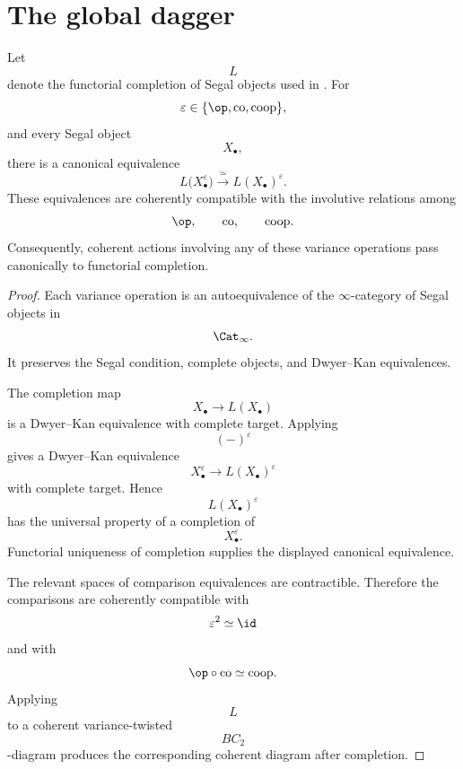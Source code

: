 \section{The global dagger}
\label{sec:global-hermitian-dagger}

\begin{lemma}
\label{lem:completion-coopposite}
Let
\[
    L
\]
denote the functorial completion of Segal objects used in
.
For
\[
    \varepsilon
    \in
    \{\op,\mathrm{co},\mathrm{coop}\},
\]
and every Segal object
\[
    X_\bullet,
\]
there is a canonical equivalence
\[
    L
    \bigl(
        X_\bullet^{\varepsilon}
    \bigr)
    \xrightarrow{\;\simeq\;}
    L(X_\bullet)^{\varepsilon}.
\]
These equivalences are coherently compatible with the involutive
relations among
\[
    \op,
    \qquad
    \mathrm{co},
    \qquad
    \mathrm{coop}.
\]
Consequently, coherent actions involving any of these variance
operations pass canonically to functorial completion.
\end{lemma}

\begin{proof}
Each variance operation is an autoequivalence of the $\infty$-category
of Segal objects in
\[
    \Cat_\infty.
\]
It preserves the Segal condition, complete objects, and
Dwyer--Kan equivalences.

The completion map
\[
    X_\bullet
    \longrightarrow
    L(X_\bullet)
\]
is a Dwyer--Kan equivalence with complete target. Applying
\[
    (-)^\varepsilon
\]
gives a Dwyer--Kan equivalence
\[
    X_\bullet^\varepsilon
    \longrightarrow
    L(X_\bullet)^\varepsilon
\]
with complete target. Hence
\[
    L(X_\bullet)^\varepsilon
\]
has the universal property of a completion of
\[
    X_\bullet^\varepsilon.
\]
Functorial uniqueness of completion supplies the displayed canonical
equivalence.

The relevant spaces of comparison equivalences are contractible.
Therefore the comparisons are coherently compatible with
\[
    \varepsilon^2\simeq\id
\]
and with
\[
    \op\circ\mathrm{co}
    \simeq
    \mathrm{coop}.
\]
Applying
\[
    L
\]
to a coherent variance-twisted
\[
    BC_2
\]
-diagram produces the corresponding coherent diagram after completion.
\end{proof}

